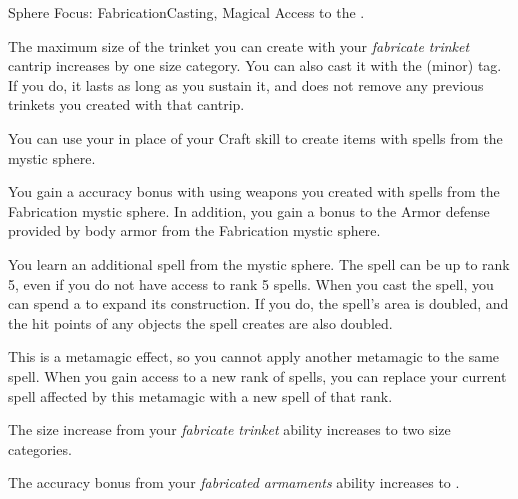   \begin{magicalfeat}{Sphere Focus: Fabrication}{Casting, Magical}
    \featpre Access to the  .

     The maximum size of the trinket you can create with your \textit{fabricate trinket} cantrip increases by one size category.
    You can also cast it with the  (minor) tag.
    If you do, it lasts as long as you sustain it, and does not remove any previous trinkets you created with that cantrip.

     You can use your  in place of your Craft skill to create items with spells from the  mystic sphere.

     You gain a  accuracy bonus with  using weapons you created with spells from the Fabrication mystic sphere.
    In addition, you gain a  bonus to the Armor defense provided by body armor from the Fabrication mystic sphere.

     You learn an additional spell from the  mystic sphere.
    The spell can be up to rank 5, even if you do not have access to rank 5 spells.
    When you cast the spell, you can spend a  to expand its construction.
    If you do, the spell's area is doubled, and the hit points of any objects the spell creates are also doubled.

    This is a metamagic effect, so you cannot apply another metamagic to the same spell.
    When you gain access to a new rank of spells, you can replace your current spell affected by this metamagic with a new spell of that rank.

     The size increase from your \textit{fabricate trinket\plus} ability increases to two size categories.

     The accuracy bonus from your \textit{fabricated armaments} ability increases to .
  \end{magicalfeat}

